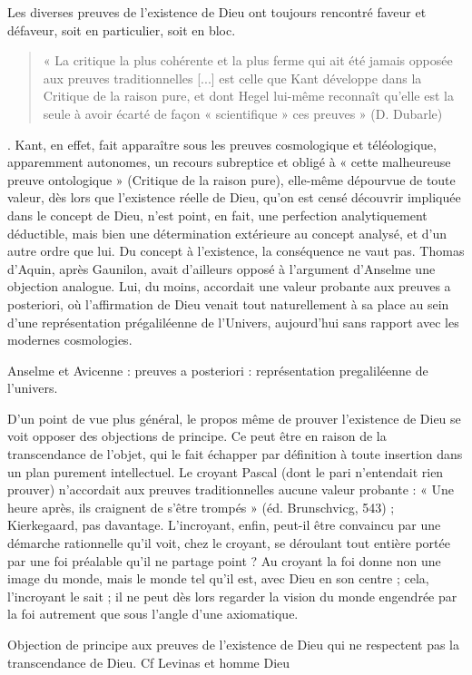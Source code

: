 Les diverses preuves de l'existence de Dieu ont toujours rencontré faveur et défaveur, soit en particulier, soit en bloc. 
\begin{quote}
    « La critique la plus cohérente et la plus ferme qui ait été jamais opposée aux preuves traditionnelles [...] est celle que Kant développe dans la Critique de la raison pure, et dont Hegel lui-même reconnaît qu'elle est la seule à avoir écarté de façon « scientifique » ces preuves » (D. Dubarle)
\end{quote}
. Kant, en effet, fait apparaître sous les preuves cosmologique et téléologique, apparemment autonomes, un recours subreptice et obligé à « cette malheureuse preuve ontologique » (Critique de la raison pure), elle-même dépourvue de toute valeur, dès lors que l'existence réelle de Dieu, qu'on est censé découvrir impliquée dans le concept de Dieu, n'est point, en fait, une perfection analytiquement déductible, mais bien une détermination extérieure au concept analysé, et d'un autre ordre que lui. Du concept à l'existence, la conséquence ne vaut pas. Thomas d'Aquin, après Gaunilon, avait d'ailleurs opposé à l'argument d'Anselme une objection analogue. Lui, du moins, accordait une valeur probante aux preuves a posteriori, où l'affirmation de Dieu venait tout naturellement à sa place au sein d'une représentation prégaliléenne de l'Univers, aujourd'hui sans rapport avec les modernes cosmologies.
\begin{Synthesis}
 Anselme et Avicenne : preuves a posteriori : représentation pregaliléenne de l'univers.
\end{Synthesis}

D'un point de vue plus général, le propos même de prouver l'existence de Dieu se voit opposer des objections de principe. Ce peut être en raison de la transcendance de l'objet, qui le fait échapper par définition à toute insertion dans un plan purement intellectuel. Le croyant Pascal (dont le pari n'entendait rien prouver) n'accordait aux preuves traditionnelles aucune valeur probante : « Une heure après, ils craignent de s'être trompés » (éd. Brunschvicg, 543) ; Kierkegaard, pas davantage. L'incroyant, enfin, peut-il être convaincu par une démarche rationnelle qu'il voit, chez le croyant, se déroulant tout entière portée par une foi préalable qu'il ne partage point ? Au croyant la foi donne non une image du monde, mais le monde tel qu'il est, avec Dieu en son centre ; cela, l'incroyant le sait ; il ne peut dès lors regarder la vision du monde engendrée par la foi autrement que sous l'angle d'une axiomatique.
\begin{Synthesis}
Objection de principe aux preuves de l'existence de Dieu qui ne respectent pas la transcendance de Dieu. Cf Levinas et homme Dieu
\end{Synthesis}

